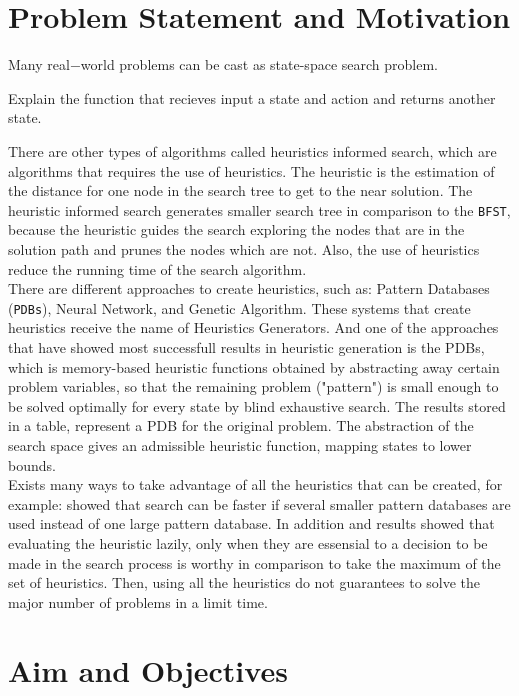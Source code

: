 \section{Problem Statement and Motivation}
\noindent
Many real$-$world problems can be cast as state-space search problem.


Explain the function that recieves input a state and action and returns another state.




There are other types of algorithms called heuristics informed search, which are algorithms that requires the use of heuristics. The heuristic is the estimation of the distance for one node in the search tree to get to the near solution. The heuristic informed search generates smaller search tree in comparison to the \texttt{BFST}, because the heuristic guides the search exploring the nodes that are in the solution path and prunes the nodes which are not. Also, the use of heuristics reduce the running time of the search algorithm. \\

There are different approaches to create heuristics, such as: Pattern Databases (\texttt{PDBs}), Neural Network, and Genetic Algorithm. These systems that create heuristics receive the name of Heuristics Generators. And one of the approaches that have showed most successfull results in heuristic generation is the PDBs, which is memory-based heuristic functions obtained by abstracting away certain problem variables, so that the remaining problem ("pattern") is small enough to be solved optimally for every state by blind exhaustive search. The results stored in a table, represent a PDB for the original problem. The abstraction of the search space gives an admissible heuristic function, mapping states to lower bounds. \\

Exists many ways to take advantage of all the heuristics that can be created, for example: \cite{holte2006maximizing} showed that search can be faster if several smaller pattern databases are used instead of one large pattern database. In addition \cite{domshlak2010max} and \cite{tolpin2013towards} results showed that evaluating the heuristic lazily, only when they are essensial to a decision to be made in the search process is worthy in comparison to take the maximum of the set of heuristics. Then, using all the heuristics do not guarantees to solve the major number of problems in a limit time.
\section{Aim and Objectives}
